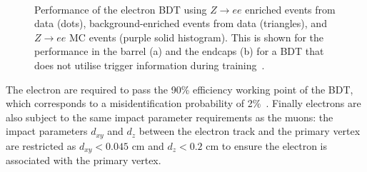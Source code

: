 \begin{figure}[t]
\centering
     \\
\caption{Performance of the electron BDT using $Z\rightarrow ee$ enriched events from data (dots), background-enriched events from data (triangles), and $Z\rightarrow ee$ MC events (purple solid histogram). This is shown for the performance in the barrel (a) and the endcaps (b) for a BDT that does not utilise trigger information during training~\cite{CMS:2015xaf}.}
\label{fig:electron_eff}
\end{figure}

The electron are required to pass the 90\% efficiency working point of the \ac{BDT}, which corresponds to a misidentification probability of 2\%~\cite{CMS:2015xaf}. 
Finally electrons are also subject to the same impact parameter requirements as the muons: the impact parameters $d_{xy}$ and $d_{z}$ between the electron track and the primary vertex are restricted as $d_{xy}<0.045$ cm and $d_{z}<0.2$ cm to ensure the electron is associated with the primary vertex. \\

